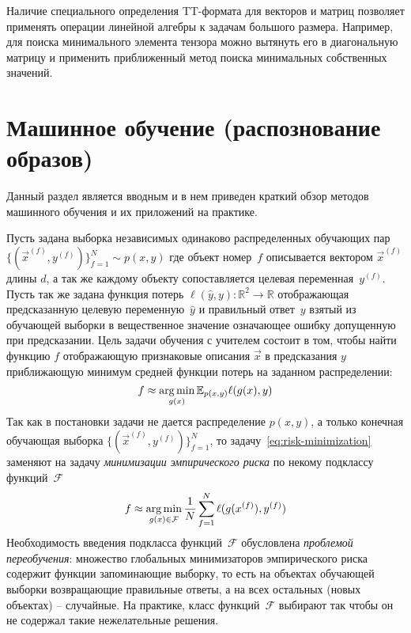 Наличие специального определения TT\hyp{}формата для векторов и матриц позволяет применять операции линейной алгебры к задачам большого размера. Например, для поиска минимального элемента тензора можно вытянуть его в диагональную матрицу и применить приближенный метод поиска минимальных собственных значений.

\section{Машинное обучение (распознование образов)} \label{sec:ml}
Данный раздел является вводным и в нем приведен краткий обзор методов машинного обучения и их приложений на практике.

Пусть задана выборка независимых одинаково распределенных обучающих пар $\{(\vec{x}^{(f)}, y^{(f)})\}_{f=1}^N \sim p(x, y)$ где объект номер~$f$ описывается вектором $\vec{x}^{(f)}$ длины $d$, а так же каждому объекту сопоставляется целевая переменная~$y^{(f)}$. Пусть так же задана функция потерь $\ell(\widehat{y}, y):\mathbb{R}^2 \to \mathbb{R}$ отображающая предсказанную целевую переменную~$\widehat{y}$ и правильный ответ~$y$ взятый из обучающей выборки в вещественное значение означающее ошибку допущенную при предсказании. Цель задачи обучения с учителем состоит в том, чтобы найти функцию $f$ отображающую признаковые описания $\vec{x}$ в предсказания $y$ приближающую минимум средней функции потерь на заданном распределении:
\begin{equation}
\label{eq:risk-minimization}
f \approx \operatorname*{arg\,min}_{g(x)} \mathbb{E}_{p(x, y)} \ell(g(x), y)	
\end{equation}
Так как в постановки задачи не дается распределение $p(x, y)$, а только конечная обучающая выборка $\{(\vec{x}^{(f)}, y^{(f)})\}_{f=1}^N$, то задачу~\eqref{eq:risk-minimization} заменяют на задачу \emph{минимизации эмпирического риска} по некому подклассу функций~$\mathcal{F}$
\begin{equation}
\label{eq:emprical-risk-minimization}
f \approx \operatorname*{arg\,min}_{g(x) \in \mathcal{F}} \frac{1}{N} \sum_{f=1}^N \ell(g(x^{(f)}), y^{(f)})
\end{equation}
Необходимость введения подкласса функций~$\mathcal{F}$ обусловлена \emph{проблемой переобучения}: множество глобальных минимизаторов эмпирического риска содержит функции запоминающие выборку, то есть на объектах обучающей выборки возвращающие правильные ответы, а на всех остальных (новых объектах) -- случайные. На практике, класс функций~$\mathcal{F}$ выбирают так чтобы он не содержал такие нежелательные решения.

